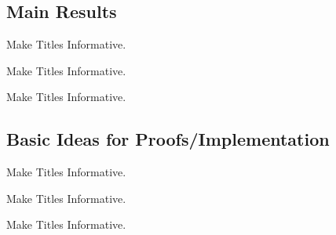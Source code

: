 \subsection{Main Results}

\begin{frame}{Make Titles Informative.}
\end{frame}

\begin{frame}{Make Titles Informative.}
\end{frame}

\begin{frame}{Make Titles Informative.}
\end{frame}


\subsection{Basic Ideas for Proofs/Implementation}

\begin{frame}{Make Titles Informative.}
\end{frame}

\begin{frame}{Make Titles Informative.}
\end{frame}

\begin{frame}{Make Titles Informative.}
\end{frame}





  



